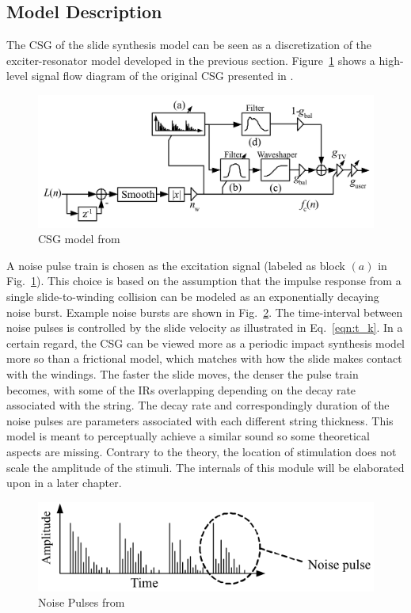 \documentclass[main.tex]{subfiles}
\begin{document}
\subsection{Model Description}
The CSG of the slide synthesis model can be seen as a discretization of the exciter-resonator model developed in the previous section. Figure~\ref{fig:original_CSG} shows a high-level signal flow diagram of the original CSG presented in . 
\begin{figure}[h]
    \centering
    \includegraphics[scale=.50]{./images/pictures/CSG_original.PNG}
    \caption{CSG model from }
    \label{fig:original_CSG}
\end{figure}
A noise pulse train is chosen as the excitation signal (labeled as block $(a)$ in Fig.~\ref{fig:original_CSG}). This choice is based on the assumption that the impulse response from a single slide-to-winding collision can be modeled as an exponentially decaying noise burst. Example noise bursts are shown in Fig.~\ref{fig:noise_pulses_ch2}. The time-interval between noise pulses is controlled by the slide velocity as illustrated in Eq.~\ref{eqn:t_k}. In a certain regard, the CSG can be viewed more as a periodic impact synthesis model more so than a frictional model, which matches with how the slide makes contact with the windings. The faster the slide moves, the denser the pulse train becomes, with some of the IRs overlapping depending on the decay rate associated with the string. The decay rate and correspondingly duration of the noise pulses are parameters associated with each different string thickness. This model is meant to perceptually achieve a similar sound so some theoretical aspects are missing. Contrary to the theory, the location of stimulation does not scale the amplitude of the stimuli. The internals of this module will be elaborated upon in a later chapter.

\begin{figure}[h]
    \centering
    \includegraphics[scale=1]{./images/pictures/noise_pulses.png}
    \caption{Noise Pulses from }
    \label{fig:noise_pulses_ch2}
\end{figure}
\end{document}
